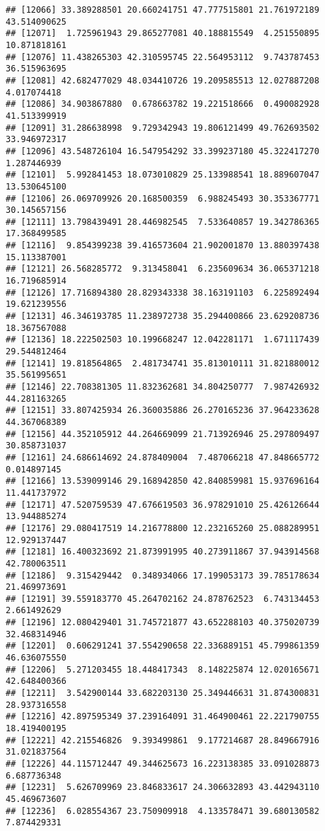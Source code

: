 \documentclass[
]{article}
\begin{document}
\begin{verbatim}
## [12066] 33.389288501 20.660241751 47.777515801 21.761972189 43.514090625
## [12071]  1.725961943 29.865277081 40.188815549  4.251550895 10.871818161
## [12076] 11.438265303 42.310595745 22.564953112  9.743787453 36.515963695
## [12081] 42.682477029 48.034410726 19.209585513 12.027887208  4.017074418
## [12086] 34.903867880  0.678663782 19.221518666  0.490082928 41.513399919
## [12091] 31.286638998  9.729342943 19.806121499 49.762693502 33.946972317
## [12096] 43.548726104 16.547954292 33.399237180 45.322417270  1.287446939
## [12101]  5.992841453 18.073010829 25.133988541 18.889607047 13.530645100
## [12106] 26.069709926 20.168500359  6.988245493 30.353367771 30.145657156
## [12111] 13.798439491 28.446982545  7.533640857 19.342786365 17.368499585
## [12116]  9.854399238 39.416573604 21.902001870 13.880397438 15.113387001
## [12121] 26.568285772  9.313458041  6.235609634 36.065371218 16.719685914
## [12126] 17.716894380 28.829343338 38.163191103  6.225892494 19.621239556
## [12131] 46.346193785 11.238972738 35.294400866 23.629208736 18.367567088
## [12136] 18.222502503 10.199668247 12.042281171  1.671117439 29.544812464
## [12141] 19.818564865  2.481734741 35.813010111 31.821880012 35.561995651
## [12146] 22.708381305 11.832362681 34.804250777  7.987426932 44.281163265
## [12151] 33.807425934 26.360035886 26.270165236 37.964233628 44.367068389
## [12156] 44.352105912 44.264669099 21.713926946 25.297809497 30.858731037
## [12161] 24.686614692 24.878409004  7.487066218 47.848665772  0.014897145
## [12166] 13.539099146 29.168942850 42.840859981 15.937696164 11.441737972
## [12171] 47.520759539 47.676619503 36.978291010 25.426126644 13.944885274
## [12176] 29.080417519 14.216778800 12.232165260 25.088289951 12.929137447
## [12181] 16.400323692 21.873991995 40.273911867 37.943914568 42.780063511
## [12186]  9.315429442  0.348934066 17.199053173 39.785178634 21.469973691
## [12191] 39.559183770 45.264702162 24.878762523  6.743134453  2.661492629
## [12196] 12.080429401 31.745721877 43.652288103 40.375020739 32.468314946
## [12201]  0.606291241 37.554290658 22.336889151 45.799861359 46.636075550
## [12206]  5.271203455 18.448417343  8.148225874 12.020165671 42.648400366
## [12211]  3.542900144 33.682203130 25.349446631 31.874300831 28.937316558
## [12216] 42.897595349 37.239164091 31.464900461 22.221790755 18.419400195
## [12221] 42.215546826  9.393499861  9.177214687 28.849667916 31.021837564
## [12226] 44.115712447 49.344625673 16.223138385 33.091028873  6.687736348
## [12231]  5.626709969 23.846833617 24.306632893 43.442943110 45.469673607
## [12236]  6.028554367 23.750909918  4.133578471 39.680130582  7.874429331

\end{verbatim}
\end{document}

